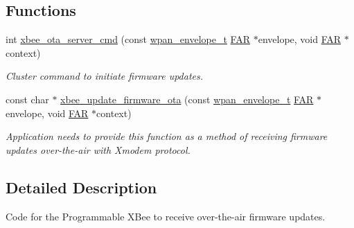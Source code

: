 \subsection*{Functions}
\begin{DoxyCompactItemize}
\item 
int \hyperlink{group__xbee__ota__server_ga22cb77be06faba4020a4f5e0daf48f4f}{xbee\-\_\-ota\-\_\-server\-\_\-cmd} (const \hyperlink{structwpan__envelope__t}{wpan\-\_\-envelope\-\_\-t} \hyperlink{group__hal_gaef060b3456fdcc093a7210a762d5f2ed}{F\-A\-R} $\ast$envelope, void \hyperlink{group__hal_gaef060b3456fdcc093a7210a762d5f2ed}{F\-A\-R} $\ast$context)
\begin{DoxyCompactList}\small\item\em Cluster command to initiate firmware updates. \end{DoxyCompactList}\item 
const char $\ast$ \hyperlink{group__xbee__ota__server_ga38fdff5e9fec8c3aa8bfd167621ee35c}{xbee\-\_\-update\-\_\-firmware\-\_\-ota} (const \hyperlink{structwpan__envelope__t}{wpan\-\_\-envelope\-\_\-t} \hyperlink{group__hal_gaef060b3456fdcc093a7210a762d5f2ed}{F\-A\-R} $\ast$envelope, void \hyperlink{group__hal_gaef060b3456fdcc093a7210a762d5f2ed}{F\-A\-R} $\ast$context)
\begin{DoxyCompactList}\small\item\em Application needs to provide this function as a method of receiving firmware updates over-\/the-\/air with Xmodem protocol. \end{DoxyCompactList}\end{DoxyCompactItemize}


\subsection{Detailed Description}
Code for the Programmable X\-Bee to receive over-\/the-\/air firmware updates. 

